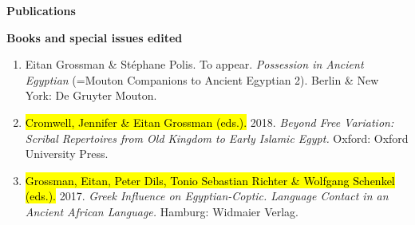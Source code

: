 \documentclass[letterpaper,11pt]{article}
\newcommand{\resheading}[1]{
\vspace*{6pt}
{\large \colorbox{mygrey}{\begin{minipage}{\textwidth}{\textbf{#1 \vphantom{p\^{E}}}}\end{minipage}}}
}
\begin{document}
\newpage
\resheading{Publications} 
\vspace*{6pt}
\hspace*{-10.5pt}
\vspace*{6pt}
\resheading{Books and special issues edited}
\begin{enumerate}


\item {Eitan Grossman \& St\'ephane Polis.} {To appear.} \textit{Possession in Ancient Egyptian} (=Mouton Companions to Ancient Egyptian 2). Berlin \& New York: De Gruyter Mouton.

\item {\hl{Cromwell, Jennifer \& Eitan Grossman (eds.).} {2018.}} \textit{Beyond Free Variation: Scribal Repertoires from Old Kingdom to Early Islamic Egypt.} Oxford: Oxford University Press. 

\item {\hl{Grossman, Eitan, Peter Dils, Tonio Sebastian Richter \& Wolfgang Schenkel (eds.).} {2017.}} \textit{Greek Influence on Egyptian-Coptic. Language Contact in an Ancient African Language.} Hamburg: Widmaier Verlag.


\end{enumerate}
\end{document}
